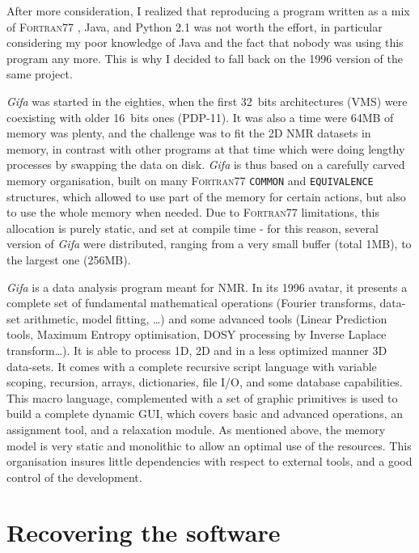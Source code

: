 After more consideration, I realized that reproducing a program written
as a mix of F\textsc{ortran}77 , Java, and Python 2.1 was not worth the
effort, in particular considering my poor knowledge of Java and the fact
that nobody was using this program any more. This is why I decided to
fall back on the 1996 version of the same project.

\emph{Gifa} was started in the eighties, when the first 32~bits
architectures (VMS) were coexisting with older 16~bits ones (PDP-11). It
was also a time were 64MB of memory was plenty, and the challenge was to
fit the 2D NMR datasets in memory, in contrast with other programs at
that time which were doing lengthy processes by swapping the data on
disk. \emph{Gifa} is thus based on a carefully carved memory
organisation, built on many F\textsc{ortran}77 \texttt{COMMON} and
\texttt{EQUIVALENCE} structures, which allowed to use part of the memory
for certain actions, but also to use the whole memory when needed. Due
to F\textsc{ortran}77 limitations, this allocation is purely static, and
set at compile time - for this reason, several version of \emph{Gifa}
were distributed, ranging from a very small buffer (total 1MB), to the
largest one (256MB).

\emph{Gifa} is a data analysis program meant for NMR. In its 1996
avatar, it presents a complete set of fundamental mathematical
operations (Fourier transforms, data-set arithmetic, model fitting,
\ldots{}) and some advanced tools (Linear Prediction tools, Maximum
Entropy optimisation, DOSY processing by Inverse Laplace
transform\ldots{}). It is able to process 1D, 2D and in a less optimized
manner 3D data-sets. It comes with a complete recursive script language
with variable scoping, recursion, arrays, dictionaries, file I/O, and
some database capabilities. This macro language, complemented with a set
of graphic primitives is used to build a complete dynamic GUI, which
covers basic and advanced operations, an assignment tool, and a
relaxation module. As mentioned above, the memory model is very static
and monolithic to allow an optimal use of the resources. This
organisation insures little dependencies with respect to external tools,
and a good control of the development.

\hypertarget{recovering-the-software}{%
\section{Recovering the software}\label{recovering-the-software}}

